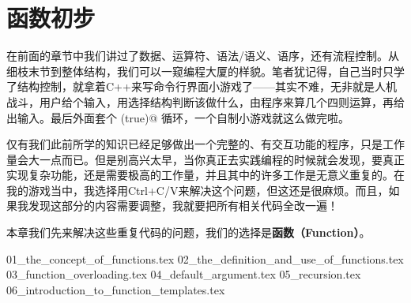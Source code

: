 \chapter{函数初步}
在前面的章节中我们讲过了数据、运算符、语法/语义、语序，还有流程控制。从细枝末节到整体结构，我们可以一窥编程大厦的样貌。笔者犹记得，自己当时只学了结构控制，就拿着C++来写命令行界面小游戏了——其实不难，无非就是人机战斗，用户给个输入，用选择结构判断该做什么，由程序来算几个四则运算，再给出输入。最后外面套个 \lstinline@while(true)@ 循环，一个自制小游戏就这么做完啦。\par
仅有我们此前所学的知识已经足够做出一个完整的、有交互功能的程序，只是工作量会大一点而已。但是别高兴太早，当你真正去实践编程的时候就会发现，要真正实现复杂功能，还是需要极高的工作量，并且其中的许多工作是无意义重复的。在我的游戏当中，我选择用Ctrl+C/V来解决这个问题，但这还是很麻烦。而且，如果我发现这部分的内容需要调整，我就要把所有相关代码全改一遍！\par
本章我们先来解决这些重复代码的问题，我们的选择是\textbf{函数（Function）}。\par
{01_the_concept_of_functions.tex}
{02_the_definition_and_use_of_functions.tex}
{03_function_overloading.tex}
{04_default_argument.tex}
{05_recursion.tex}
{06_introduction_to_function_templates.tex}